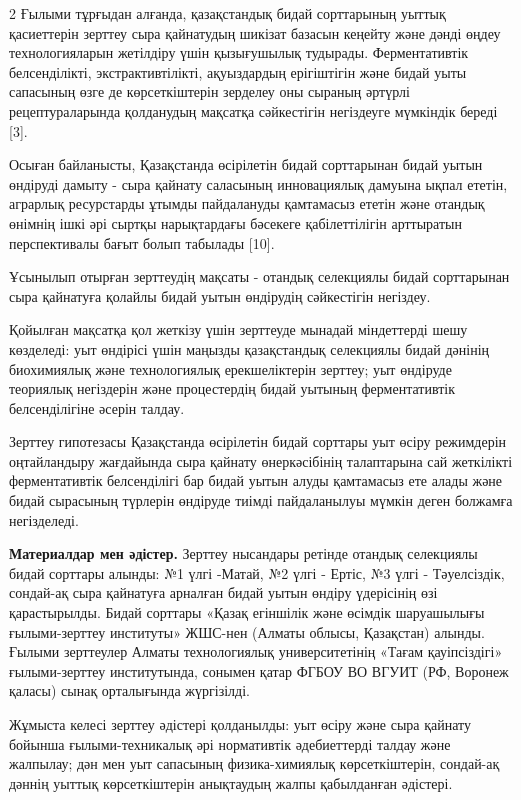 \begin{multicols}{2}
Ғылыми тұрғыдан алғанда, қазақстандық бидай сорттарының уыттық
қасиеттерін зерттеу сыра қайнатудың шикізат базасын кеңейту және дәнді
өңдеу технологияларын жетілдіру үшін қызығушылық тудырады.
Ферментативтік белсенділікті, экстрактивтілікті, ақуыздардың ерігіштігін
және бидай уыты сапасының өзге де көрсеткіштерін зерделеу оны сыраның
әртүрлі рецептураларында қолданудың мақсатқа сәйкестігін негіздеуге
мүмкіндік береді {[}3{]}.

Осыған байланысты, Қазақстанда өсірілетін бидай сорттарынан бидай уытын
өндіруді дамыту - сыра қайнату саласының инновациялық дамуына ықпал
ететін, аграрлық ресурстарды ұтымды пайдалануды қамтамасыз ететін және
отандық өнімнің ішкі әрі сыртқы нарықтардағы бәсекеге қабілеттілігін
арттыратын перспективалы бағыт болып табылады {[}10{]}.

Ұсынылып отырған зерттеудің мақсаты - отандық селекциялы бидай
сорттарынан сыра қайнатуға қолайлы бидай уытын өндірудің сәйкестігін
негіздеу.

Қойылған мақсатқа қол жеткізу үшін зерттеуде мынадай міндеттерді шешу
көзделеді: уыт өндірісі үшін маңызды қазақстандық селекциялы бидай
дәнінің биохимиялық және технологиялық ерекшеліктерін зерттеу; уыт
өндіруде теориялық негіздерін және процестердің бидай уытының
ферментативтік белсенділігіне әсерін талдау.

Зерттеу гипотезасы Қазақстанда өсірілетін бидай сорттары уыт өсіру
режимдерін оңтайландыру жағдайында сыра қайнату өнеркәсібінің
талаптарына сай жеткілікті ферментативтік белсенділігі бар бидай уытын
алуды қамтамасыз ете алады және бидай сырасының түрлерін өндіруде тиімді
пайдаланылуы мүмкін деген болжамға негізделеді.

{\bfseries Материалдар мен әдістер.} Зерттеу нысандары ретінде отандық
селекциялы бидай сорттары алынды: №1 үлгі -Матай, №2 үлгі - Ертіс, №3
үлгі - Тәуелсіздік, сондай-ақ сыра қайнатуға арналған бидай уытын өндіру
үдерісінің өзі қарастырылды. Бидай сорттары «Қазақ егіншілік және
өсімдік шаруашылығы ғылыми-зерттеу институты» ЖШС-нен (Алматы облысы,
Қазақстан) алынды. Ғылыми зерттеулер Алматы технологиялық
университетінің «Тағам қауіпсіздігі» ғылыми-зерттеу институтында,
сонымен қатар ФГБОУ ВО ВГУИТ (РФ, Воронеж қаласы) сынақ орталығында
жүргізілді.

Жұмыста келесі зерттеу әдістері қолданылды: уыт өсіру және сыра қайнату
бойынша ғылыми-техникалық әрі нормативтік әдебиеттерді талдау және
жалпылау; дән мен уыт сапасының физика-химиялық көрсеткіштерін,
сондай-ақ дәннің уыттық көрсеткіштерін анықтаудың жалпы қабылданған
әдістері.


\end{multicols}
